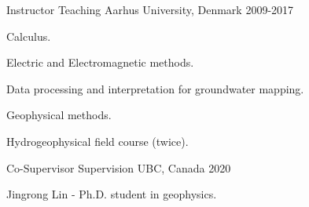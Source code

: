 

\begin{cventries}

  \cventry
    {Instructor} %
    {Teaching} %
    {Aarhus University, Denmark} %
    {2009-2017} %
    {
      \begin{cvitems} %
        \item {Calculus.}
        \item {Electric and Electromagnetic methods.}
        \item {Data processing and interpretation for groundwater mapping.}
        \item {Geophysical methods.}
        \item {Hydrogeophysical field course (twice).}
      \end{cvitems}
    }

  \cventry
    {Co-Supervisor} %
    {Supervision} %
    {UBC, Canada} %
    {2020} %
    {
      \begin{cvitems} %
        \item {Jingrong Lin - Ph.D. student in geophysics.}
      \end{cvitems}
    }


\end{cventries}
